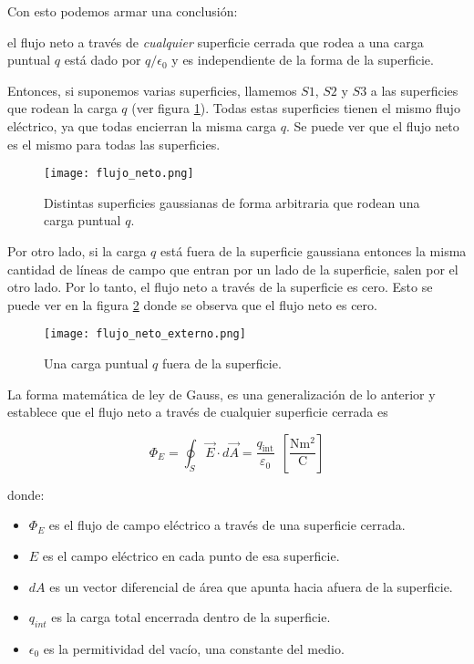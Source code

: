 Con esto podemos armar una conclusión:

\begin{tcolorbox}[myconclusion]
    el flujo neto a través de \textit{cualquier} superficie cerrada que rodea a una carga puntual \(q\) está dado por \(q/\epsilon_0\) y es independiente de la forma de la superficie.
\end{tcolorbox}

Entonces, si suponemos varias superficies, llamemos \(S1\), \(S2\) y \(S3\) a las superficies que rodean la carga \(q\) (ver figura \ref{fig:superficie_gaussiana_arbitraria}). Todas estas superficies tienen el mismo flujo eléctrico, ya que todas encierran la misma carga \(q\). Se puede ver que el flujo neto es el mismo para todas las superficies.

\begin{figure}[ht]
    \centering
    \texttt{[image: flujo\_neto.png]}
    \caption{Distintas superficies gaussianas de forma arbitraria que rodean una carga puntual \(q\).}
    \label{fig:superficie_gaussiana_arbitraria}
\end{figure}

Por otro lado, si la carga \(q\) está fuera de la superficie gaussiana entonces la misma cantidad de líneas de campo que entran por un lado de la superficie, salen por el otro lado. Por lo tanto, el flujo neto a través de la superficie es cero. Esto se puede ver en la figura \ref{fig:flujo_neto_2} donde se observa que el flujo neto es cero.

\begin{figure}[ht]
    \centering
    \texttt{[image: flujo\_neto\_externo.png]}
    \caption{Una carga puntual \(q\) fuera de la superficie.}
    \label{fig:flujo_neto_2}
\end{figure}

La forma matemática de ley de Gauss, es una generalización de lo anterior y establece que el flujo neto a través de cualquier superficie cerrada es

\begin{equation}
    \Phi_E = \oint_{S} \vec{E} \cdot d\vec{A} = \frac{q_{\text{int}}}{\varepsilon_0} ~~ \left[\frac{\si{\newton \meter \squared}}{\si{\coulomb}}\right]
\end{equation}

donde:
\begin{itemize}
    \item \( \Phi_E \) es el flujo de campo eléctrico a través de una superficie cerrada.
    \item \(E\) es el campo eléctrico en cada punto de esa superficie.
    \item \(dA\) es un vector diferencial de área que apunta hacia afuera de la superficie.
    \item \(q_{int}\) es la carga total encerrada dentro de la superficie.
    \item \(\epsilon_0\) es la permitividad del vacío, una constante del medio.
\end{itemize}

